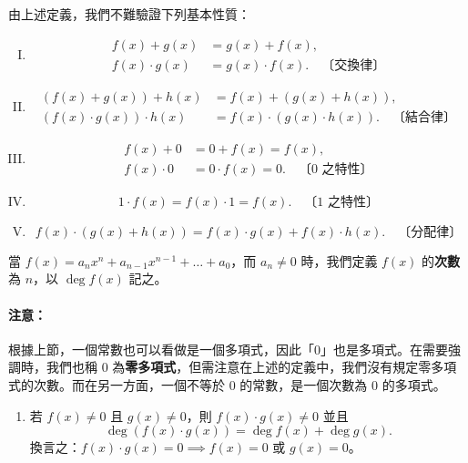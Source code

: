 由上述定義，我們不難驗證下列基本性質：
\begin{enumerate}[(I)]
  \item 
  \begin{align*}
    f(x)+g(x) &= g(x)+f(x), \\
    f(x) \cdot g(x) &= g(x) \cdot f(x). \quad \text{〔交換律〕}
  \end{align*}

  \item 
  \begin{align*}
    (f(x)+g(x))+h(x) &= f(x)+(g(x)+h(x)), \\
    (f(x) \cdot g(x)) \cdot h(x) &= f(x) \cdot (g(x) \cdot h(x)). \quad \text{〔結合律〕}
  \end{align*}

  \item 
  \begin{align*}
    f(x)+0 &= 0+f(x) = f(x), \\
    f(x) \cdot 0 &= 0 \cdot f(x) = 0. \quad \text{〔0 之特性〕}
  \end{align*}

  \item 
  \begin{equation*}
    1 \cdot f(x) = f(x) \cdot 1 = f(x). \quad \text{〔1 之特性〕}
  \end{equation*}

  \item 
  \begin{equation*}
    f(x) \cdot (g(x)+h(x)) = f(x) \cdot g(x) + f(x) \cdot h(x). \quad \text{〔分配律〕}
  \end{equation*}
\end{enumerate}

\begin{definition*}
當 $f(x)=a_n x^n + a_{n-1} x^{n-1} + \dots + a_0$，而 $a_n \neq 0$ 時，我們定義 $f(x)$ 的\textbf{次數}為 $n$，以 $\deg f(x)$ 記之。
\end{definition*}

\paragraph{注意：}
根據上節，一個常數也可以看做是一個多項式，因此「$0$」也是多項式。在需要強調時，我們也稱 $0$ 為\textbf{零多項式}，但需注意在上述的定義中，我們沒有規定零多項式的次數。而在另一方面，一個不等於 $0$ 的常數，是一個次數為 $0$ 的多項式。

\begin{enumerate}[label=(\Roman*), start=6]
  \item 若 $f(x) \neq 0$ 且 $g(x) \neq 0$，則 $f(x) \cdot g(x) \neq 0$ 並且
  \begin{equation*}
    \deg(f(x) \cdot g(x)) = \deg f(x) + \deg g(x).
  \end{equation*}
  換言之：$f(x) \cdot g(x) = 0 \implies f(x)=0$ 或 $g(x)=0$。
\end{enumerate}

